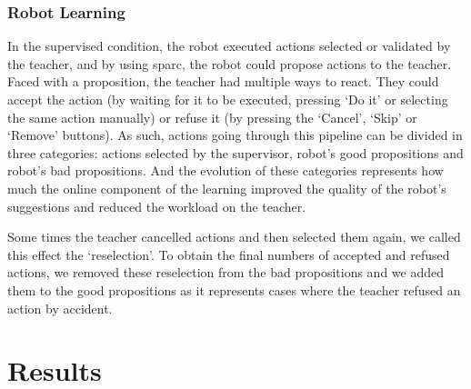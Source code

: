 
\subsubsection{Robot Learning}

In the supervised condition, the robot executed actions selected or validated by the teacher, and by using \gls{sparc}, the robot could propose actions to the teacher. Faced with a proposition, the teacher had multiple ways to react. They could accept the action (by waiting for it to be executed, pressing `Do it' or selecting the same action manually) or refuse it (by pressing the `Cancel', `Skip' or `Remove' buttons). As such, actions going through this pipeline can be divided in three categories: actions selected by the supervisor, robot's good propositions and robot's bad propositions. And the evolution of these categories represents how much the online component of the learning improved the quality of the robot's suggestions and reduced the workload on the teacher. 

Some times the teacher cancelled actions and then selected them again, we called this effect the `reselection'. To obtain the final numbers of accepted and refused actions, we removed these reselection from the bad propositions and we added them to the good propositions as it represents cases where the teacher refused an action by accident.

\section{Results}



